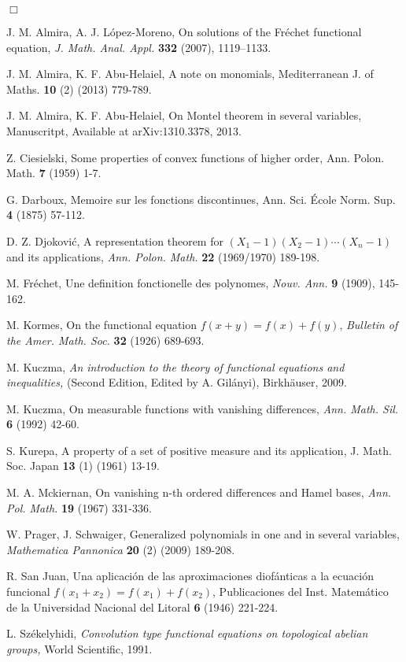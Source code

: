 \documentclass[10pt,a4paper]{amsart}
\theoremstyle{definition}
\begin{document}
{\hfill $\Box$}

 

\begin{thebibliography}{99}
                                                                                                
 {\sc J. M. Almira, A. J.  L\'{o}pez-Moreno, } On solutions of the Fr\'{e}chet functional equation, \emph{J. Math. Anal. Appl. } \textbf{332} (2007), 1119--1133.

 {\sc J. M. Almira, K. F. Abu-Helaiel, } A note on monomials, Mediterranean J. of Maths. \textbf{10} (2) (2013)  779-789.

 {\sc J. M. Almira, K. F. Abu-Helaiel, } On Montel theorem in several variables, Manuscritpt,  Available at arXiv:1310.3378, 2013. 

 {\sc Z. Ciesielski, } Some properties of convex functions of higher order, Ann. Polon. Math. \textbf{7} (1959) 1-7.

 {\sc G. Darboux, } Memoire sur les fonctions discontinues, Ann. Sci. \'{E}cole Norm. Sup. \textbf{4} (1875) 57-112.

 {\sc D. Z. Djokovi\'{c}, } A representation theorem for $(X_1-1)(X_2-1)\cdots(X_n-1)$ and its applications, \emph{Ann. Polon. Math.} \textbf{22} (1969/1970) 189-198.

 {\sc M. Fr\'{e}chet, }   Une definition fonctionelle des polynomes, \emph{Nouv. Ann.} \textbf{9} (1909), 145-162.

 {\sc M. Kormes, } On the functional equation $f(x+y)=f(x)+f(y)$, \emph{Bulletin of the Amer. Math. Soc. } \textbf{32} (1926) 689-693.

 {\sc M. Kuczma}, \emph{An introduction to the theory of functional equations and inequalities, } (Second Edition, Edited by A. Gil\'{a}nyi), Birkh\"{a}user, 2009.

 {\sc M. Kuczma}, On measurable functions with
vanishing differences, \emph{Ann. Math. Sil.} \textbf{6} (1992) 42-60.

 {\sc S. Kurepa, } A property of a set  of positive measure and its application, J. Math. Soc. Japan \textbf{13} (1) (1961) 13-19.

  {\sc M. A. Mckiernan, } On vanishing n-th ordered
differences and Hamel bases, \emph{Ann. Pol. Math.} \textbf{19} (1967) 331-336.

 {\sc W. Prager, J. Schwaiger, } Generalized polynomials in one and in several variables, \emph{Mathematica Pannonica}  \textbf{20} (2) (2009) 189-208.

 {\sc R. San Juan, } Una aplicaci\'{o}n de las aproximaciones diof\'{a}nticas a la ecuaci\'{o}n funcional $f(x_1+x_2)=f(x_1)+f(x_2)$, Publicaciones del Inst. Matem\'{a}tico de la Universidad Nacional del Litoral \textbf{6} (1946) 221-224.

 {\sc L. Sz\'{e}kelyhidi, } \emph{Convolution type functional equations on topological abelian groups, }  World Scientific, 1991.

\end{thebibliography}
\end{document}

